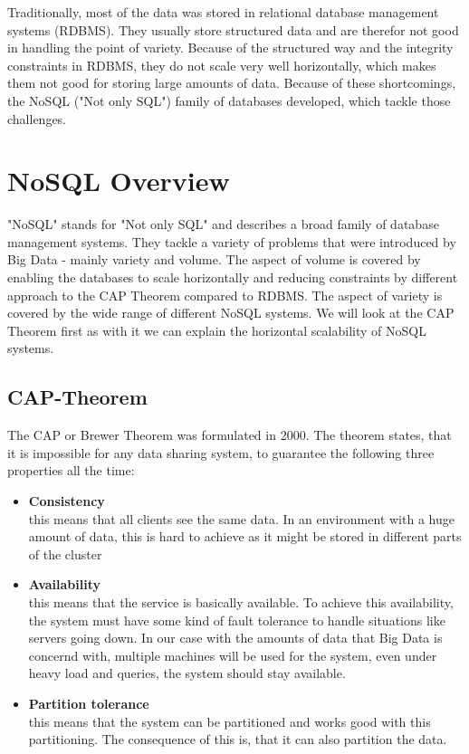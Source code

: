 \documentclass{acm_proc_article-sp}
\begin{document}
Traditionally, most of the data was stored in relational database management systems (RDBMS). They usually store structured data and are therefor not good in handling the point of variety. Because of the structured way and the integrity constraints in RDBMS, they do not scale very well horizontally, which makes them not good for storing large amounts of data. Because of these shortcomings, the NoSQL ("Not only SQL") family of databases developed, which tackle those challenges.

\section{NoSQL Overview}

"NoSQL" stands for "Not only SQL" and describes a broad family of database management systems. They tackle a variety of problems that were introduced by Big Data - mainly variety and volume. The aspect of volume is covered by enabling the databases to scale horizontally and reducing constraints by different approach to the CAP Theorem compared to RDBMS. The aspect of variety is covered by the wide range of different NoSQL systems. We will look at the CAP Theorem first as with it we can explain the horizontal scalability of NoSQL systems.

\subsection{CAP-Theorem}

The CAP or Brewer Theorem\cite{Gilbert:2002:BCF:564585.564601} was formulated in 2000. The  theorem  states, that it is impossible for any data sharing system, to guarantee the following three properties all the time:

\begin{itemize}
	\item \textbf{Consistency} \\ this means that all clients see the same data. In an environment with a huge amount of data, this is hard to achieve as it might be stored in different parts of the cluster
	\item \textbf{Availability} \\ this means that the service is basically available. To achieve this availability, the system must have some kind of fault tolerance to handle situations like servers going down. In our case with the amounts of data that Big Data is concernd with, multiple machines will be used for the system, even under heavy load and queries, the system should stay available.
	\item \textbf{Partition tolerance} \\ this means that the system can be partitioned and works good with this partitioning. The consequence of this is, that it can also partition the data.
\end{itemize}
\end{document}
